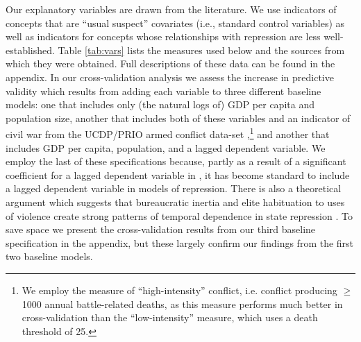\documentclass[12pt]{article}
\begin{document}
Our explanatory variables are drawn from the literature. We use indicators of concepts that are ``usual suspect'' covariates (i.e., standard control variables) as well as indicators for concepts whose relationships with repression are less well-established. Table \ref{tab:vars} lists the measures used below and the sources from which they were obtained. Full descriptions of these data can be found in the appendix. In our cross-validation analysis we assess the increase in predictive validity which results from adding each variable to three different baseline models: one that includes only (the natural logs of) GDP per capita and population size, another that includes both of these variables and an indicator of civil war from the UCDP/PRIO armed conflict data-set \citep{ThemnerWallensteen2012},\footnote{We employ the measure of ``high-intensity'' conflict, i.e. conflict producing $\geq$ 1000 annual battle-related deaths, as this measure performs much better in cross-validation than the ``low-intensity'' measure, which uses a death threshold of 25.} and another that includes GDP per capita, population, and a lagged dependent variable. We employ the last of these specifications because, partly as a result of a significant coefficient for a lagged dependent variable in \citet{PoeTate1994}, it has become standard to include a lagged dependent variable in models of repression. There is also a theoretical argument which suggests that bureaucratic inertia and elite habituation to uses of violence create strong patterns of temporal dependence  in state repression \citep[E.g.,][]{Gurr1988,Davenport2007}. To save space we present the cross-validation results from our third baseline specification in the appendix, but these largely confirm our findings from the first two baseline models. 
\end{document}
